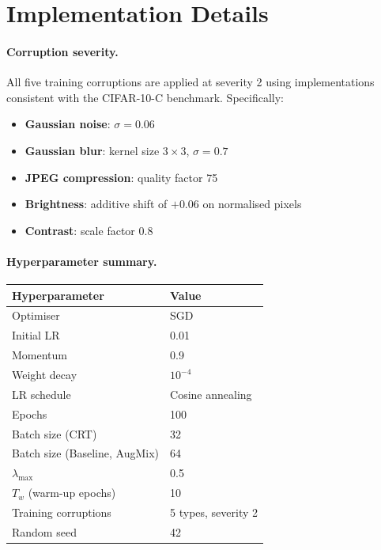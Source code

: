\documentclass[10pt,twocolumn]{article}
\begin{document}
\appendix

\section{Implementation Details}
\label{app:implementation}

\paragraph{Corruption severity.} All five training corruptions are applied at severity 2 using implementations consistent with the CIFAR-10-C benchmark. Specifically:
\begin{itemize}[leftmargin=*, topsep=2pt, itemsep=1pt]
  \item \textbf{Gaussian noise}: $\sigma = 0.06$
  \item \textbf{Gaussian blur}: kernel size $3 \times 3$, $\sigma = 0.7$
  \item \textbf{JPEG compression}: quality factor 75
  \item \textbf{Brightness}: additive shift of $+0.06$ on normalised pixels
  \item \textbf{Contrast}: scale factor $0.8$
\end{itemize}

\paragraph{Hyperparameter summary.}
\begin{center}
\begin{tabular}{ll}
\toprule
Hyperparameter & Value \\
\midrule
Optimiser & SGD \\
Initial LR & 0.01 \\
Momentum & 0.9 \\
Weight decay & $10^{-4}$ \\
LR schedule & Cosine annealing \\
Epochs & 100 \\
Batch size (CRT) & 32 \\
Batch size (Baseline, AugMix) & 64 \\
$\lambda_{\max}$ & 0.5 \\
$T_w$ (warm-up epochs) & 10 \\
Training corruptions & 5 types, severity 2 \\
Random seed & 42 \\
\bottomrule
\end{tabular}
\end{center} 
\end{document}
